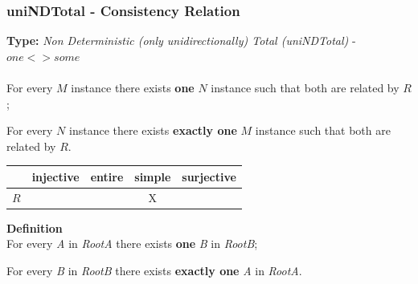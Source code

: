 \documentclass{beamer}
\newcommand{\cmark}{\ding{51}}%
\begin{document}
\begin{frame}
\frametitle{uniNDTotal - \textbf{Consistency Relation}}

\textbf{Type:} \textit{Non Deterministic (only unidirectionally) Total (uniNDTotal)} - $one <> some$\\

~\\
For every $M$ instance there
exists \textbf{one} $N$ instance such that both are related by $R$;

For every $N$ instance there
exists \textbf{exactly one} $M$ instance such that both are related by $R$.

\begin{center}
\begin{tabular}{| c | c | c | c | c | }
  \hline                        
   & injective & entire & simple & surjective \\
  \hline 
  $R$ & \cmark & \cmark & X & \cmark\\
  \hline  
\end{tabular}
\end{center}


\textbf{Definition}\\

For every \textit{A} in \textit{RootA} there
exists \textbf{one} \textit{B} in \textit{RootB};


For every \textit{B} in \textit{RootB} there
exists \textbf{exactly one} \textit{A} in \textit{RootA}.

\end{frame}
\end{document}

